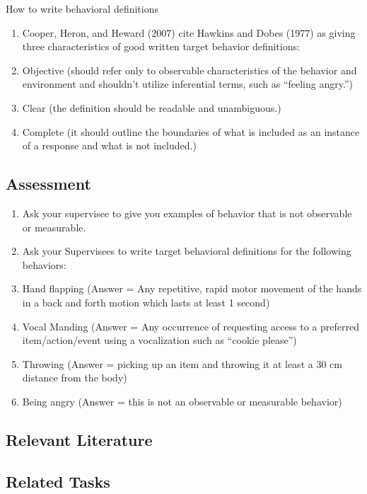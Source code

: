 How to write behavioral definitions
\begin{enumerate}
\item Cooper, Heron, and Heward (2007) cite Hawkins and Dobes (1977) as giving three characteristics of good written target behavior definitions:
\item Objective (should refer only to observable characteristics of the behavior and environment and shouldn't utilize inferential terms, such as ``feeling angry.'')
\item Clear (the definition should be readable and unambiguous.)
\item Complete (it should outline the boundaries of what is included as an instance of a response and what is not included.)
\end{enumerate}
%
\subsection{Assessment}
\begin{enumerate}
\item Ask your supervisee to give you examples of behavior that is not observable or measurable.
\item Ask your Supervisees to write target behavioral definitions for the following behaviors:
\item Hand flapping (Answer = Any repetitive, rapid motor movement of the hands in a back and forth motion which lasts at least 1 second) 
\item Vocal Manding (Answer = Any occurrence of requesting access to a preferred item/action/event using a vocalization such as ``cookie please'')
\item Throwing (Answer = picking up an item and throwing it at least a 30 cm distance from the body) 
\item Being angry (Answer = this is not an observable or measurable behavior)
%
\end{enumerate}
%
\subsection{Relevant Literature}
\begin{refsection}
\nocite{cooper2007applied,
        baer1968some,
        hawkins1977behavioral,
        van1979social}
\printbibliography[heading=none]
\end{refsection}
%
\subsection{Related Tasks}
\fourhOne{}\\
\fourhTwo{}\\
\fouriTwo{}\\
\fourjOne{}\\
\fourFKFourtySeven{}\\
%
\clearpage \section[\fouriTwo{}]{\fouriTwo{}%
              }
